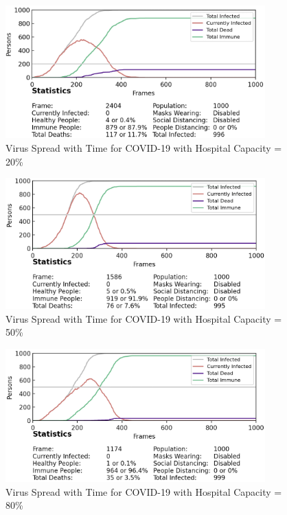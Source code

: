 \documentclass[11pt]{article}
\begin{document}
 \begin{figure}[H]
    \centering
    \includegraphics[width=10cm]{figures/hospital_capacity_20percent.png}
    \caption{Virus Spread with Time for COVID-19 with Hospital Capacity = 20\%}
    \label{hospital_capacity_20percent}
\end{figure}

\begin{figure}[H]
    \centering
    \includegraphics[width=10cm]{figures/hospital_capacity_50percent.png}
    \caption{Virus Spread with Time for COVID-19 with Hospital Capacity = 50\%}
    \label{hospital_capacity_50percent}
\end{figure}

\begin{figure}[H]
    \centering
    \includegraphics[width=10cm]{figures/hospital_capacity_80percent.png}
    \caption{Virus Spread with Time for COVID-19 with Hospital Capacity = 80\%}
    \label{hospital_capacity_80percent}
\end{figure}
\end{document}
